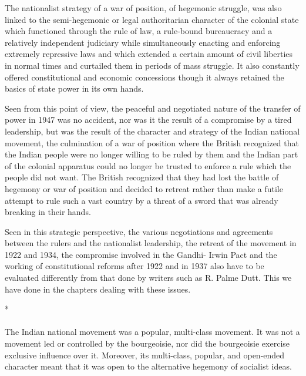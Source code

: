 \begin{multicols}{2}
The nationalist strategy of a war of position, of hegemonic struggle, was also linked to the semi-hegemonic or legal authoritarian character of the colonial state which functioned through the rule of law, a rule-bound bureaucracy and a relatively independent judiciary while simultaneously enacting and enforcing extremely repressive laws and which extended a certain amount of civil liberties in normal times and curtailed them in periods of mass struggle. It also constantly offered constitutional and economic concessions though it always retained the basics of state power in its own hands.

Seen from this point of view, the peaceful and negotiated nature of the transfer of power in 1947 was no accident, nor was it the result of a compromise by a tired leadership, but was the result of the character and strategy of the Indian national movement, the culmination of a war of position where the British recognized that the Indian people were no longer willing to be ruled by them and the Indian part of the colonial apparatus could no longer be trusted to enforce a rule which the people did not want. The British recognized that they had lost the battle of hegemony or war of position and decided to retreat rather than make a futile attempt to rule such a vast country by a threat of a sword that was already breaking in their hands.

Seen in this strategic perspective, the various negotiations and agreements between the rulers and the nationalist leadership, the retreat of the movement in 1922 and 1934, the compromise involved in the Gandhi- Irwin Pact and the working of constitutional reforms after 1922 and in 1937 also have to be evaluated differently from that done by writers such as R. Palme Dutt. This we have done in the chapters dealing with these issues.

\begin{center}*\end{center}

\paragraph*{}
The Indian national movement was a popular, multi-class movement. It was not a movement led or controlled by the bourgeoisie, nor did the bourgeoisie exercise exclusive influence over it. Moreover, its multi-class, popular, and open-ended character meant that it was open to the alternative hegemony of socialist ideas.


\end{multicols}
